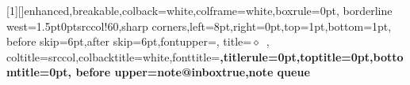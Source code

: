 \makeatletter
\newenvironment{nfigure}{\par\medskip\begin{center}\def\@captype{figure}}{\end{center}\medskip}
\makeatother
[1][]{enhanced,breakable,colback=white,colframe=white,boxrule=0pt,
  borderline west={1.5pt}{0pt}{srccol!60},sharp corners,left=8pt,right=0pt,top=1pt,bottom=1pt,
  before skip=6pt,after skip=6pt,fontupper=\small,
  title={\footnotesize\sffamily$\diamond$\ },
  coltitle=srccol,colbacktitle=white,fonttitle=\bfseries,titlerule=0pt,toptitle=0pt,bottomtitle=0pt,
  before upper={\csname note@inboxtrue\endcsname},note queue}
\makeatletter
{}
